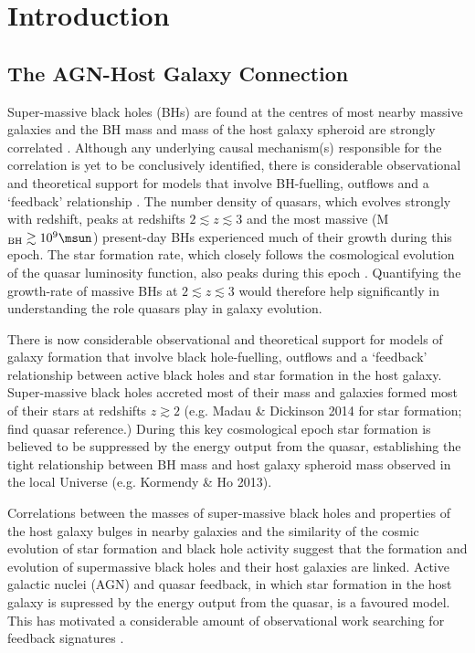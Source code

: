 
\chapter{Introduction}\label{ch:introduction}

\section{The AGN-Host Galaxy Connection}

Super-massive black holes (BHs) are found at the centres of most nearby massive galaxies and the BH mass and mass of the host galaxy spheroid are strongly correlated \citep{ferrarese00,gebhardt00,kormendy13}. 
Although any underlying causal mechanism(s) responsible for the correlation is yet to be conclusively identified, there is considerable observational and theoretical support for models that involve BH-fuelling, outflows and a `feedback' relationship \citep[e.g.][]{king15}.  
The number density of quasars, which evolves strongly with redshift, peaks at redshifts $2 \lesssim z \lesssim 3$ \citep[e.g.][]{brandt05,richards06b} and the most massive (M$_{\rm BH} \gtrsim 10^9\msun$) present-day BHs experienced much of their growth during this epoch.  
The star formation rate, which closely follows the cosmological evolution of the quasar luminosity function, also peaks during this epoch \citep[e.g.][]{boyle98}. 
Quantifying the growth-rate of massive BHs at $2 \lesssim z \lesssim 3$ would therefore help significantly in understanding the role quasars play in galaxy evolution.

There is now considerable observational and theoretical support for models of galaxy formation that involve black hole-fuelling, outflows and a ‘feedback’ relationship between active black holes and star formation in the host galaxy. 
Super-massive black holes accreted most of their mass and galaxies formed most of their stars at redshifts $z\gtrsim2$ (e.g. Madau \& Dickinson 2014 for star formation; find quasar reference.)
During this key cosmological epoch star formation is believed to be suppressed by the energy output from the quasar, establishing the tight relationship between BH mass and host galaxy spheroid mass observed in the local Universe (e.g. Kormendy \& Ho 2013). 

Correlations between the masses of super-massive black holes and properties of the host galaxy bulges in nearby galaxies \citep{gebhardt00,ferrarese00} and the similarity of the cosmic evolution of star formation and black hole activity \citep{boyle98,madau14} suggest that the formation and evolution of supermassive black holes and their host galaxies are linked. 
Active galactic nuclei (AGN) and quasar feedback, in which star formation in the host galaxy is supressed by the energy output from the quasar, is a favoured model.
This has motivated a considerable amount of observational work searching for feedback signatures \citep[for recent reviews, see][]{alexander12,fabian12,heckman14}. 

